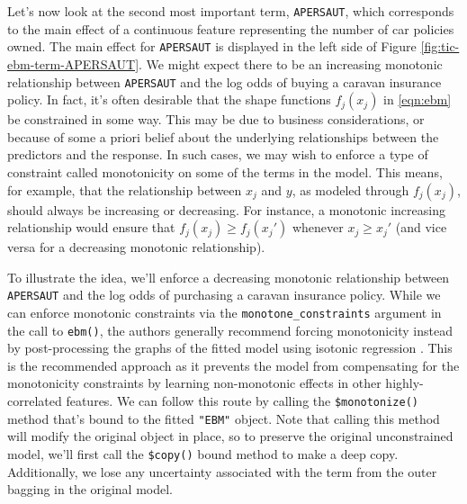 Let's now look at the second most important term, \texttt{APERSAUT},
which corresponds to the main effect of a continuous feature
representing the number of car policies owned. The main effect for
\texttt{APERSAUT} is displayed in the left side of Figure
\ref{fig:tic-ebm-term-APERSAUT}. We might expect there to be an
increasing monotonic relationship between \texttt{APERSAUT} and the log
odds of buying a caravan insurance policy. In fact, it's often desirable
that the shape functions \(f_j\left(x_j\right)\) in \eqref{eqn:ebm} be
constrained in some way. This may be due to business considerations, or
because of some a priori belief about the underlying relationships
between the predictors and the response. In such cases, we may wish to
enforce a type of constraint called monotonicity on some of the terms in
the model. This means, for example, that the relationship between
\(x_j\) and \(y\), as modeled through \(f_j\left(x_j\right)\), should
always be increasing or decreasing. For instance, a monotonic increasing
relationship would ensure that
\(f_j\left(x_j\right) \ge f_j\left(x_j'\right)\) whenever
\(x_j \ge x_j'\) (and vice versa for a decreasing monotonic
relationship).

To illustrate the idea, we'll enforce a decreasing monotonic
relationship between \texttt{APERSAUT} and the log odds of purchasing a
caravan insurance policy. While we can enforce monotonic constraints via
the \texttt{monotone\_constraints} argument in the call to
\texttt{ebm()}, the  authors generally recommend forcing
monotonicity instead by post-processing the graphs of the fitted model
using isotonic regression \citep{barlow-1972-isotonic}. This is the
recommended approach as it prevents the model from compensating for the
monotonicity constraints by learning non-monotonic effects in other
highly-correlated features. We can follow this route by calling the
\texttt{\$monotonize()} method that's bound to the fitted \texttt{"EBM"}
object. Note that calling this method will modify the original object in
place, so to preserve the original unconstrained model, we'll first call
the \texttt{\$copy()} bound method to make a deep copy. Additionally, we
lose any uncertainty associated with the term from the outer bagging in
the original model.

